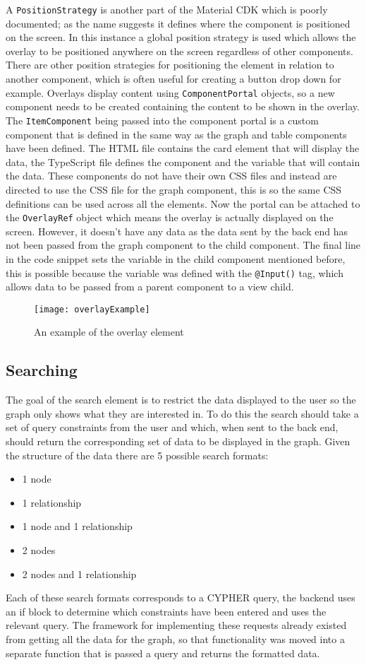 A \verb|PositionStrategy| is another part of the Material CDK which is poorly documented; as the name suggests it defines where the component is positioned on the screen.
In this instance a global position strategy is used which allows the overlay to be positioned anywhere on the screen regardless of other components. There are 
other position strategies for positioning the element in relation to another component, which is often useful for creating a button drop down for example.
Overlays display content using \verb|ComponentPortal| objects, so a new component needs to be created containing the content to be shown in the overlay. 
The \verb|ItemComponent| being passed into the component portal is a custom component that is defined in the same way as the graph and table components have been defined.
The HTML file contains the card element that will display the data, the TypeScript file defines the component and the variable that will contain the data. These components do not 
have their own CSS files and instead are directed to use the CSS file for the graph component, this is so the same CSS definitions can be used across all the elements.
Now the portal can be attached to the \verb|OverlayRef| object which means the overlay is actually displayed on the screen. However, it doesn't have any data as the data sent by the 
back end has not been passed from the graph component to the child component. The final line in the code snippet sets the variable in the child component mentioned before, this is possible because 
the variable was defined with the \verb|@Input()| tag, which allows data to be passed from a parent component to a view child.
\begin{figure}[!htbp]
    \centering
    \texttt{[image: overlayExample]}
    \caption{An example of the overlay element}
\end{figure}
\subsection{Searching}
The goal of the search element is to restrict the data displayed to the user so the graph only shows what they are interested in.
To do this the search should take a set of query constraints from the user and which, when sent to the back end, should return the 
corresponding set of data to be displayed in the graph. Given the structure of the data there are 5 possible search formats:
\begin{itemize}
    \item 1 node
    \item 1 relationship
    \item 1 node and 1 relationship
    \item 2 nodes
    \item 2 nodes and 1 relationship
\end{itemize}
Each of these search formats corresponds to a CYPHER query, the backend uses an if block to determine which constraints have been 
entered and uses the relevant query. The framework for implementing these requests already existed from getting all the data for the graph, so that 
functionality was moved into a separate function that is passed a query and returns the formatted data. 

